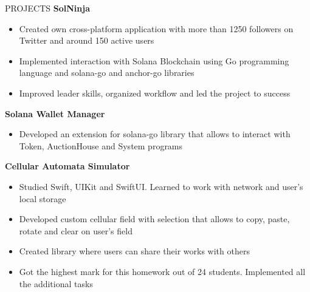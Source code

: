 \documentclass{cv} %
\begin{document}
\begin{rSection}{PROJECTS}
 \textbf{SolNinja}
 \begin{itemize}
    \itemsep -3pt {}
     \item Created own cross-platform application with more than 1250 followers on Twitter and around 150 active users
     \item Implemented interaction with Solana Blockchain using Go programming language and solana-go and anchor-go libraries
     \item Improved leader skills, organized workflow and led the project to success
 \end{itemize}
 
 \textbf{Solana Wallet Manager}
 \begin{itemize}
    \itemsep -3pt {}
     \item Developed an extension for solana-go library that allows to interact with Token, AuctionHouse and System programs
 \end{itemize}
 \textbf{Cellular Automata Simulator}
 \begin{itemize}
    \itemsep -3pt {}
     \item Studied Swift, UIKit and SwiftUI. Learned to work with network and user's local storage
     \item Developed custom cellular field with selection that allows to copy, paste, rotate and clear on user's field
     \item Created library where users can share their works with others
     \item Got the highest mark for this homework out of 24 students. Implemented all the additional tasks
 \end{itemize}
\end{rSection} 

\end{document}
